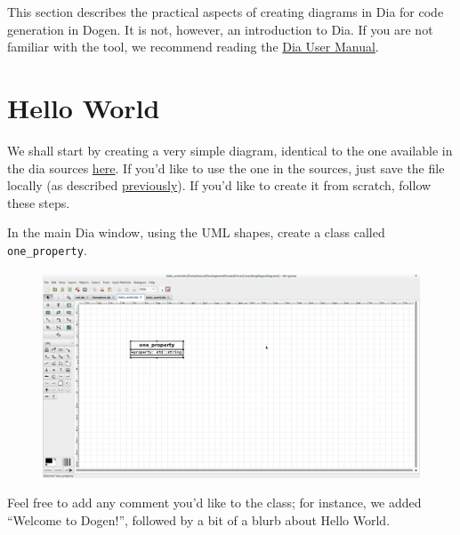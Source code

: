\documentclass{book}
\begin{document}
This section describes the practical aspects of creating diagrams in
Dia for code generation in Dogen. It is not, however, an introduction
to Dia. If you are not familiar with the tool, we recommend reading
the \href{http://dia-installer.de/doc/en/}{Dia User Manual}.

\section{Hello World}

We shall start by creating a very simple diagram, identical to the one
available in the dia sources
\href{https://raw.githubusercontent.com/DomainDrivenConsulting/dogen/master/diagrams/hello_world.dia}{here}. If
you'd like to use the one in the sources, just save the file locally
(as described
\href{https://github.com/DomainDrivenConsulting/dogen/blob/master/doc/manual/manual.org#generating-hello-world}{previously}). If
you'd like to create it from scratch, follow these steps.

In the main Dia window, using the UML shapes, create a class called
\texttt{one\_property}.

\begin{figure}[H]
    \centering
    \includegraphics[scale=0.2]{images/dia_hello_world_diagram.png}
    \caption{}
\end{figure}

Feel free to add any comment you'd like to the class; for instance, we
added ``Welcome to Dogen!'', followed by a bit of a blurb about Hello
World.
\end{document}
